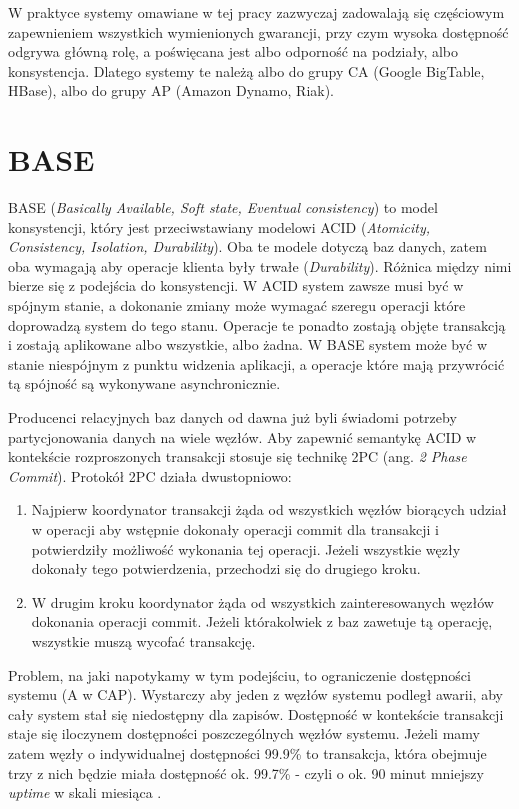 W praktyce systemy omawiane w tej pracy zazwyczaj zadowalają się częściowym zapewnieniem wszystkich wymienionych gwarancji, przy czym wysoka dostępność odgrywa główną rolę, a poświęcana jest albo odporność na podziały, albo konsystencja. 
Dlatego systemy te należą albo do grupy CA (Google BigTable, HBase), albo do grupy AP (Amazon Dynamo, Riak).

\section{BASE}

BASE (\emph{Basically Available, Soft state, Eventual consistency}) to model konsystencji, który jest przeciwstawiany modelowi ACID (\emph{Atomicity, Consistency, Isolation, Durability}). 
Oba te modele dotyczą baz danych, zatem oba wymagają aby operacje klienta były trwałe (\emph{Durability}).
Różnica między nimi bierze się z podejścia do konsystencji.
W ACID system zawsze musi być w spójnym stanie, a dokonanie zmiany może wymagać szeregu operacji które doprowadzą system do tego stanu.
Operacje te ponadto zostają objęte transakcją i zostają aplikowane albo wszystkie, albo żadna.
W BASE system może być w stanie niespójnym z punktu widzenia aplikacji, a operacje które mają przywrócić tą spójność są wykonywane asynchronicznie.

Producenci relacyjnych baz danych od dawna już byli świadomi potrzeby partycjonowania danych na wiele węzłów.
Aby zapewnić semantykę ACID w kontekście rozproszonych transakcji stosuje się technikę 2PC (ang. \emph{2 Phase Commit}).
Protokół 2PC działa dwustopniowo:

\begin{enumerate}
 \item Najpierw koordynator transakcji żąda od wszystkich węzłów biorących udział w operacji aby wstępnie dokonały operacji commit dla transakcji i potwierdziły możliwość wykonania tej operacji.
 Jeżeli wszystkie węzły dokonały tego potwierdzenia, przechodzi się do drugiego kroku.
 \item W drugim kroku koordynator żąda od wszystkich zainteresowanych węzłów dokonania operacji commit.
 Jeżeli którakolwiek z baz zawetuje tą operację, wszystkie muszą wycofać transakcję.
\end{enumerate}

Problem, na jaki napotykamy w tym podejściu, to ograniczenie dostępności systemu (A w CAP).
Wystarczy aby jeden z węzłów systemu podległ awarii, aby cały system stał się niedostępny dla zapisów.
Dostępność w kontekście transakcji staje się iloczynem dostępności poszczególnych węzłów systemu.
Jeżeli mamy zatem węzły o indywidualnej dostępności 99.9\% to transakcja, która obejmuje trzy z nich będzie miała dostępność ok. 99.7\% - czyli o ok. 90 minut mniejszy \emph{uptime} w skali miesiąca \cite{base-an-acid-alternative}.

